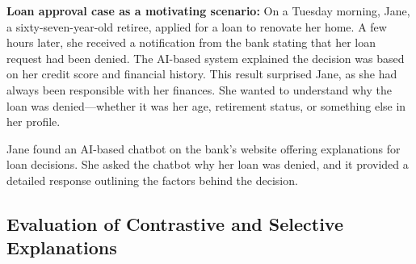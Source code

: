 
\textbf{Loan approval case as a motivating scenario:} On a Tuesday morning, Jane, a sixty-seven-year-old retiree, applied for a loan to renovate her home. A few hours later, she received a notification from the bank stating that her loan request had been denied. The AI-based system explained the decision was based on her credit score and financial history. This result surprised Jane, as she had always been responsible with her finances. She wanted to understand why the loan was denied---whether it was her age, retirement status, or something else in her profile.



Jane found an AI-based chatbot on the bank's website offering explanations for loan decisions. She asked the chatbot why her loan was denied, and it provided a detailed response outlining the factors behind the decision.

\subsection{Evaluation of Contrastive and Selective Explanations}


